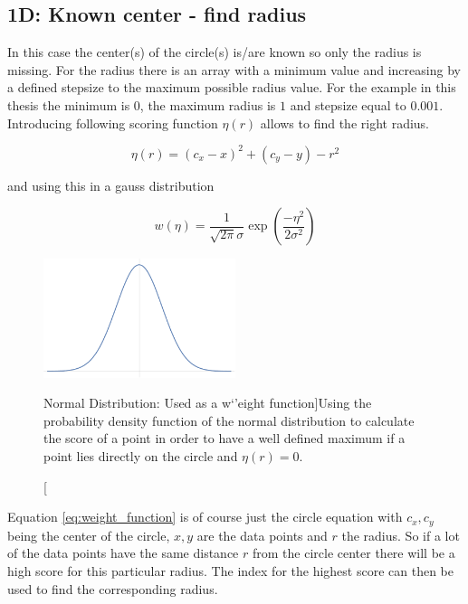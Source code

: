 \documentclass[11pt,twoside]{scrreprt}
\begin{document}
\subsection{1D: Known center - find radius} %
\label{sub:1d_known_center_find_radius}

In this case the center(s) of the circle(s) is/are known so only the radius is missing. For the radius there is an array with a minimum value
and increasing by a defined stepsize to the maximum possible radius value. For the example in this thesis the minimum is $0$, the maximum radius
is $1$ and stepsize equal to $0.001$. Introducing following scoring function $\eta(r)$ allows to find the right radius.

\begin{equation}
\label{eq:score_function}
  \eta(r) = (c_x - x)^2 + (c_y - y) - r ^ 2
\end{equation}

and using this in a gauss distribution

\begin{equation}
\label{eq:weight_function}
  w(\eta) = \frac{1}{\sqrt{2\pi}\sigma}\exp\left( \frac{-\eta^2}{2\sigma^2}\right)
\end{equation}
\begin{figure}[tb]
  \centering
  \includegraphics[width=0.5\textwidth]{pics/gauss}
  \caption[Normal Distribution: Used as a w`'eight function]{Using the probability density function of the normal distribution to calculate the score of a point in order to have a well defined maximum if a point
  lies directly on the circle and $\eta(r) = 0$. }
  \label{fig:gauss}
\end{figure}
Equation \ref{eq:weight_function} is of course just the circle equation with $c_x, c_y$ being the center of the circle, $x, y$ are the data points and $r$ the radius.
So if a lot of the data points have the same distance $r$ from the circle center there will be a high score for this particular radius. The index
for the highest score can then be used to find the corresponding radius.
\end{document}
